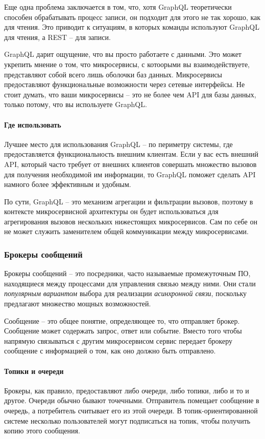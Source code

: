 \documentclass[%
	11pt,
	a4paper,
	utf8,
		]{article}
\begin{document}
Еще одна проблема заключается в том, что, хотя GraphQL теоретически способен обрабатывать процесс записи, он подходит для этого не так хорошо, как для чтения. Это приводит к ситуациям, в которых команды используют GraphQL для чтения, а REST -- для записи.

GraphQL дарит ощущение, что вы просто работаете с данными. Это может укрепить мнение о том, что микросервисы, с котоорыми вы взаимодействуете, представляют собой всего лишь оболочки баз данных. Микросервисы предоставляют функциональные возможности через сетевые интерфейсы. Не стоит думать, что ваши микросервисы -- это не более чем API для базы данных, только потому, что вы используете GraphQL.

\paragraph{Где использовать} Лучшее место для использования GraphQL -- по периметру системы, где предоставляется функциональность внешним клиентам. Если у вас есть внешний API, который часто требует от внешних клиентов совершать множество вызовов для получения необходимой им информации, то GraphQL поможет сделать API намного более эффективным и удобным.

По сути, GraphQL -- это механизм агрегации и фильтрации вызовов, поэтому в контексте микросервисной архитектуры он будет использоваться для агрегирования вызовов нескольких нижестоящих микросервисов. Сам по себе он не может служить заменителем общей коммуникации между микросервисами.

\subsubsection{Брокеры сообщений}

Брокеры сообщений -- это посредники, часто называемые промежуточным ПО, находящиеся между процессами для управления связью между ними. Они стали \emph{популярным вариантом} выбора для реализации \emph{асинхронной связи}, поскольку предлагают множество мощных возможностей.

Сообщение -- это общее понятие, определяющее то, что отправляет брокер. Сообщение может содержать запрос, ответ или событие. Вместо того чтобы напрямую связываться с другим микросервисом сервис передает брокеру сообщение с информацией о том, как оно должно быть отправлено.

\paragraph{Топики и очереди} Брокеры, как правило, предоставляют либо очереди, либо топики, либо и то и другое. Очереди обычно бывают точечными. Отправитель помещает сообщение в очередь, а потребитель считывает его из этой очереди. В топик-ориентированной системе несколько пользователей могут подписаться на топик, чтобы получить копию этого сообщения.
\end{document}
